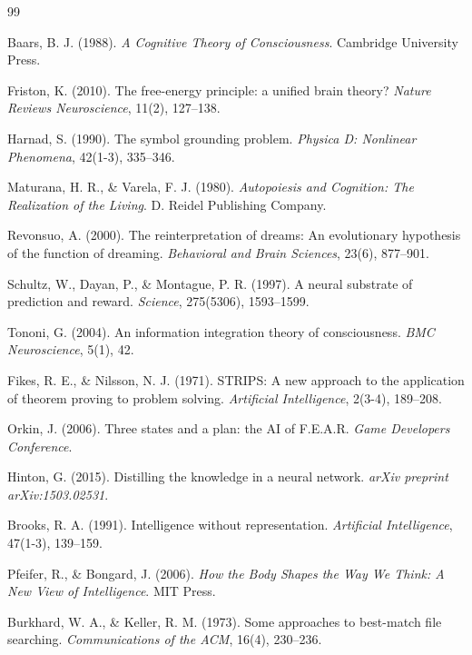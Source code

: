 \documentclass[12pt,a4paper]{report}
\begin{document}
\begin{thebibliography}{99}

Baars, B. J. (1988).
\textit{A Cognitive Theory of Consciousness}.
Cambridge University Press.

Friston, K. (2010).
The free-energy principle: a unified brain theory?
\textit{Nature Reviews Neuroscience}, 11(2), 127--138.

Harnad, S. (1990).
The symbol grounding problem.
\textit{Physica D: Nonlinear Phenomena}, 42(1-3), 335--346.

Maturana, H. R., \& Varela, F. J. (1980).
\textit{Autopoiesis and Cognition: The Realization of the Living}.
D. Reidel Publishing Company.

Revonsuo, A. (2000).
The reinterpretation of dreams: An evolutionary hypothesis of the function of dreaming.
\textit{Behavioral and Brain Sciences}, 23(6), 877--901.

Schultz, W., Dayan, P., \& Montague, P. R. (1997).
A neural substrate of prediction and reward.
\textit{Science}, 275(5306), 1593--1599.

Tononi, G. (2004).
An information integration theory of consciousness.
\textit{BMC Neuroscience}, 5(1), 42.

Fikes, R. E., \& Nilsson, N. J. (1971).
STRIPS: A new approach to the application of theorem proving to problem solving.
\textit{Artificial Intelligence}, 2(3-4), 189--208.

Orkin, J. (2006).
Three states and a plan: the AI of F.E.A.R.
\textit{Game Developers Conference}.

Hinton, G. (2015).
Distilling the knowledge in a neural network.
\textit{arXiv preprint arXiv:1503.02531}.

Brooks, R. A. (1991).
Intelligence without representation.
\textit{Artificial Intelligence}, 47(1-3), 139--159.

Pfeifer, R., \& Bongard, J. (2006).
\textit{How the Body Shapes the Way We Think: A New View of Intelligence}.
MIT Press.

Burkhard, W. A., \& Keller, R. M. (1973).
Some approaches to best-match file searching.
\textit{Communications of the ACM}, 16(4), 230--236.


\end{thebibliography}
\end{document}
